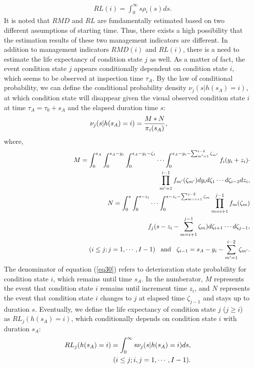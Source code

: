 \begin{eqnarray}
&& RL(i)=\int_{0}^\infty s \rho_i(s) ds. \label{r1}
\end{eqnarray}
It is noted that $RMD$ and $RL$ are fundamentally estimated based on two different assumptions of starting time. Thus, there exists a high possibility that the estimation results of these two management indicators are different. In addition to management indicators $RMD(i)$ and $RL(i)$, there is a need to estimate the life expectancy of condition state $j$ as well. As a matter of fact, the event condition state $j$ appears conditionally dependent on condition state $i$, which seems to be observed at inspection time $\tau_A$. By the law of conditional probability, we can define the conditional probability density $\nu_{j}(s|h(s_A)=i)$, at which condition state will disappear given the visual observed condition state $i$ at time $\tau_A=\tau_0+s_A$ and the elapsed duration time $s$:
\begin{eqnarray}
&& \hspace{-2mm} \nu_{j}(s|h(s_A)=i) = \frac{M*N}{\pi_i(s_A)}, \label{eq30}
\end{eqnarray}
where,
\begin{eqnarray}
&& M = \int_{0}^{s_A}
\int_0^{s_A-y_i} \int_0^{s_A-y_i-\zeta_1}\cdots \int_0^{s_A-y_i-\sum_{m^\prime=1}^{i-3}\zeta_{m^\prime}}f_i(y_i+z_i)\cdot \nonumber\\
&& \hspace{80mm}\prod_{m^\prime=1}^{i-1} f_{m^\prime}(\zeta_{m^\prime})dy_i d\zeta_1\cdots d\zeta_{i-2}dz_i, \nonumber \\
&& N = \int_0^{s}\int_0^{s-z_i} \cdots \int_{0}^{s-z_i-\sum_{m=i+1}^{j-2}\zeta_m }\prod_{m=i+1}^{j-1}f_m(\zeta_m)  \nonumber \\
&& \hspace{75mm}f_j(s-z_i-\sum_{m=i+1}^{j-1} \zeta_m)d\zeta_{i+1}\cdots  d\zeta_{j-1}, \nonumber \\
&& (i\leq j; j=1,\cdots,I-1) \hspace{3mm} \text{and} \hspace{3mm} \zeta_{i-1}=s_A-y_i-\sum_{m^\prime=1}^{i-2}\zeta_{m^\prime}. \nonumber
\end{eqnarray}
The denominator of equation (\ref{eq30}) refers to deterioration state probability for condition state $i$, which remains until time $s_A$. In the numberator, $M$ represents the event that condition state $i$ remains until increment time $z_i$, and  $N$ represents the event that condition state $i$ changes to $j$ at elapsed time $\zeta_{j-1}$ and stays up to duration $s$. Eventually, we define the life expectancy of condition state $j$ ($j \geq i$) as $RL_{j}(h(s_A)=i)$, which conditionally depends on condition state $i$ with duration $s_A$:
\begin{eqnarray}
&&\hspace{-3mm}  RL_{j}(h(s_A)=i)=\int_{0}^{\infty} s \nu_j(s|h(s_A)=i)ds,
\label{r2}\\
&& (i\leq j; i,j=1,\cdots,I-1). \nonumber
\end{eqnarray}
